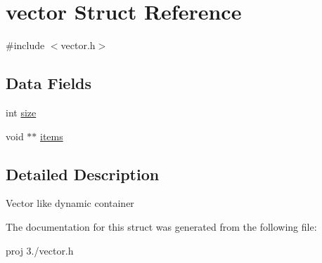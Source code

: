 \hypertarget{structvector}{}\section{vector Struct Reference}
\label{structvector}


{\ttfamily \#include $<$vector.\+h$>$}

\subsection*{Data Fields}
\begin{DoxyCompactItemize}
\item 
int \hyperlink{group__vector_ga439227feff9d7f55384e8780cfc2eb82}{size}
\item 
void $\ast$$\ast$ \hyperlink{group__vector_ga94977134c19c2c536550e6b13d69218d}{items}
\end{DoxyCompactItemize}


\subsection{Detailed Description}
Vector like dynamic container 

The documentation for this struct was generated from the following file\+:\begin{DoxyCompactItemize}
\item 
proj 3./vector.\+h\end{DoxyCompactItemize}
